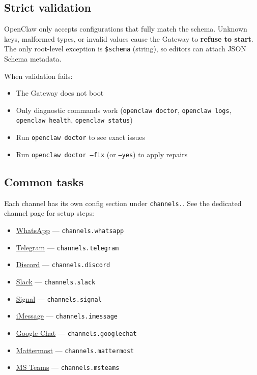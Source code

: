 \subsection{Strict validation}


OpenClaw only accepts configurations that fully match the schema. Unknown keys, malformed types, or invalid values cause the Gateway to \textbf{refuse to start}. The only root-level exception is \texttt{\$schema} (string), so editors can attach JSON Schema metadata.

When validation fails:

\begin{itemize}
  \item The Gateway does not boot
  \item Only diagnostic commands work (\texttt{openclaw doctor}, \texttt{openclaw logs}, \texttt{openclaw health}, \texttt{openclaw status})
  \item Run \texttt{openclaw doctor} to see exact issues
  \item Run \texttt{openclaw doctor --fix} (or \texttt{--yes}) to apply repairs
\end{itemize}


\subsection{Common tasks}


Each channel has its own config section under \texttt{channels.}. See the dedicated channel page for setup steps:

\begin{itemize}
  \item \href{/channels/whatsapp}{WhatsApp} — \texttt{channels.whatsapp}
  \item \href{/channels/telegram}{Telegram} — \texttt{channels.telegram}
  \item \href{/channels/discord}{Discord} — \texttt{channels.discord}
  \item \href{/channels/slack}{Slack} — \texttt{channels.slack}
  \item \href{/channels/signal}{Signal} — \texttt{channels.signal}
  \item \href{/channels/imessage}{iMessage} — \texttt{channels.imessage}
  \item \href{/channels/googlechat}{Google Chat} — \texttt{channels.googlechat}
  \item \href{/channels/mattermost}{Mattermost} — \texttt{channels.mattermost}
  \item \href{/channels/msteams}{MS Teams} — \texttt{channels.msteams}
\end{itemize}


